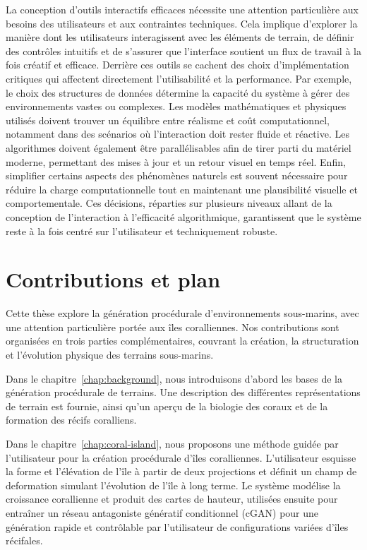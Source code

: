 La conception d'outils interactifs efficaces nécessite une attention particulière aux besoins des utilisateurs et aux contraintes techniques. Cela implique d'explorer la manière dont les utilisateurs interagissent avec les éléments de terrain, de définir des contrôles intuitifs et de s'assurer que l'interface soutient un flux de travail à la fois créatif et efficace. Derrière ces outils se cachent des choix d'implémentation critiques qui affectent directement l'utilisabilité et la performance. Par exemple, le choix des structures de données détermine la capacité du système à gérer des environnements vastes ou complexes. Les modèles mathématiques et physiques utilisés doivent trouver un équilibre entre réalisme et coût computationnel, notamment dans des scénarios où l'interaction doit rester fluide et réactive. Les algorithmes doivent également être parallélisables afin de tirer parti du matériel moderne, permettant des mises à jour et un retour visuel en temps réel. Enfin, simplifier certains aspects des phénomènes naturels est souvent nécessaire pour réduire la charge computationnelle tout en maintenant une plausibilité visuelle et comportementale. Ces décisions, réparties sur plusieurs niveaux allant de la conception de l'interaction à l'efficacité algorithmique, garantissent que le système reste à la fois centré sur l'utilisateur et techniquement robuste.

\section*{Contributions et plan}

Cette thèse explore la génération procédurale d'environnements sous-marins, avec une attention particulière portée aux îles coralliennes. Nos contributions sont organisées en trois parties complémentaires, couvrant la création, la structuration et l'évolution physique des terrains sous-marins.

Dans le chapitre~\ref{chap:background}, nous introduisons d'abord les bases de la génération procédurale de terrains. Une description des différentes représentations de terrain est fournie, ainsi qu'un aperçu de la biologie des coraux et de la formation des récifs coralliens.

    Dans le chapitre~\ref{chap:coral-island}, nous proposons une méthode guidée par l'utilisateur pour la création procédurale d'îles coralliennes. L'utilisateur esquisse la forme et l'élévation de l'île à partir de deux projections et définit un champ de deformation simulant l'évolution de l'île à long terme. Le système modélise la croissance corallienne et produit des cartes de hauteur, utilisées ensuite pour entraîner un réseau antagoniste génératif conditionnel (cGAN) pour une génération rapide et contrôlable par l'utilisateur de configurations variées d'îles récifales.

